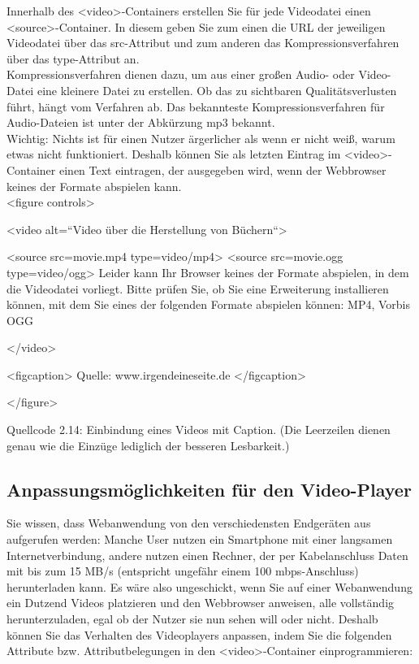 Innerhalb des <video>-Containers erstellen Sie für jede Videodatei einen <source>-Container. In diesem geben Sie zum einen die URL der jeweiligen Videodatei über das src-Attribut und zum anderen das Kompressionsverfahren über das type-Attribut an.\\

Kompressionsverfahren dienen dazu, um aus einer großen Audio- oder Video-Datei eine kleinere Datei zu erstellen. Ob das zu sichtbaren Qualitätsverlusten führt, hängt vom Verfahren ab. Das bekannteste Kompressionsverfahren für Audio-Dateien ist unter der Abkürzung mp3 bekannt.\\

Wichtig: Nichts ist für einen Nutzer ärgerlicher als wenn er nicht weiß, warum etwas nicht funktioniert. Deshalb können Sie als letzten Eintrag im <video>-Container einen Text eintragen, der ausgegeben wird, wenn der Webbrowser keines der Formate abspielen kann.\\


<figure controls>

<video alt=“Video über die Herstellung von Büchern“>

<source src=movie.mp4 type=video/mp4>
<source src=movie.ogg type=video/ogg>
Leider kann Ihr Browser keines der Formate abspielen, in dem die Videodatei vorliegt. Bitte prüfen Sie, ob Sie eine Erweiterung installieren können, mit dem Sie eines der folgenden Formate abspielen können: MP4, Vorbis OGG

</video>

<figcaption>
Quelle: www.irgendeineseite.de
</figcaption>

</figure>

Quellcode 2.14: Einbindung eines Videos mit Caption. (Die Leerzeilen dienen genau wie die Einzüge lediglich der besseren Lesbarkeit.)

\subsection{Anpassungsmöglichkeiten für den Video-Player}

Sie wissen, dass Webanwendung von den verschiedensten Endgeräten aus aufgerufen werden: Manche User nutzen ein Smartphone mit einer langsamen Internetverbindung, andere nutzen einen Rechner, der per Kabelanschluss Daten mit bis zum 15 MB/s (entspricht ungefähr einem 100 mbps-Anschluss) herunterladen kann. Es wäre also ungeschickt, wenn Sie auf einer Webanwendung ein Dutzend Videos platzieren und den Webbrowser anweisen, alle vollständig herunterzuladen, egal ob der Nutzer sie nun sehen will oder nicht. Deshalb können Sie das Verhalten des Videoplayers anpassen, indem Sie die folgenden Attribute bzw. Attributbelegungen in den <video>-Container einprogrammieren:\\

